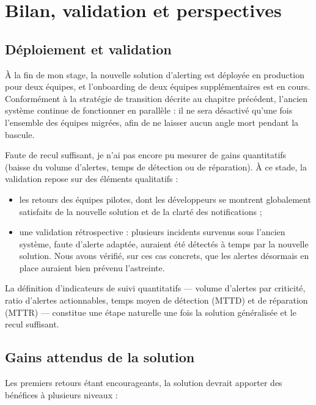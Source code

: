 \chapter{Bilan, validation et perspectives}

\section{Déploiement et validation}

À la fin de mon stage, la nouvelle solution d'alerting est déployée en production pour deux équipes, et
l'onboarding de deux équipes supplémentaires est en cours. Conformément à la stratégie de transition
décrite au chapitre précédent, l'ancien système continue de fonctionner en parallèle : il ne sera
désactivé qu'une fois l'ensemble des équipes migrées, afin de ne laisser aucun angle mort pendant la
bascule.

Faute de recul suffisant, je n'ai pas encore pu mesurer de gains quantitatifs (baisse du volume
d'alertes, temps de détection ou de réparation). À ce stade, la validation repose sur des éléments
qualitatifs :

\begin{itemize}
	\item les retours des équipes pilotes, dont les développeurs se montrent globalement satisfaits de la nouvelle solution et de la clarté des notifications ;
	\item une validation rétrospective : plusieurs incidents survenus sous l'ancien système, faute d'alerte adaptée, auraient été détectés à temps par la nouvelle solution. Nous avons vérifié, sur ces cas concrets, que les alertes désormais en place auraient bien prévenu l'astreinte.
\end{itemize}

La définition d'indicateurs de suivi quantitatifs — volume d'alertes par criticité, ratio d'alertes
actionnables, temps moyen de détection (MTTD) et de réparation (MTTR) — constitue une étape
naturelle une fois la solution généralisée et le recul suffisant.

\section{Gains attendus de la solution}

Les premiers retours étant encourageants, la solution devrait apporter des bénéfices à plusieurs
niveaux :


